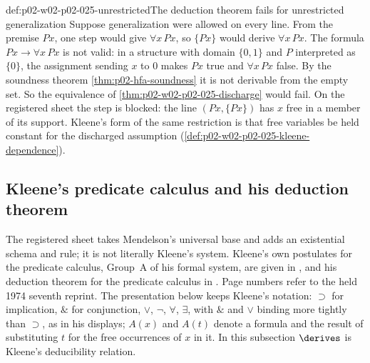 \begin{hbwarning}{def:p02-w02-p02-025-unrestricted}{The deduction theorem fails for unrestricted generalization}
Suppose generalization were allowed on every line.  From the premise \(Px\),
one step would give \(\forall x\,Px\), so
\(\{Px\}\) would derive \(\forall x\,Px\).  The formula
\(Px\to\forall x\,Px\) is not valid: in a structure with domain \(\{0,1\}\)
and \(P\) interpreted as \(\{0\}\), the assignment sending \(x\) to \(0\)
makes \(Px\) true and \(\forall x\,Px\) false.  By the soundness theorem
\cref{thm:p02-hfa-soundness} it is not derivable from the empty set.  So the
equivalence of \cref{thm:p02-w02-p02-025-discharge} would fail.  On the
registered sheet the step is blocked: the line \((Px,\{Px\})\) has \(x\) free
in a member of its support.  Kleene's form of the same restriction is that
free variables be held constant for the discharged assumption
(\cref{def:p02-w02-p02-025-kleene-dependence}).
\end{hbwarning}

\subsection{Kleene's predicate calculus and his deduction theorem}
\label{sec:p02-w02-p02-025-kleene}

The registered sheet takes Mendelson's universal base and adds an
existential schema and rule; it is not literally Kleene's system.  Kleene's
own postulates for the predicate calculus, Group~A of his formal system, are
given in \cite[\S 19, pp.~81--82]{Kleene1952}, and his deduction theorem for
the predicate calculus in \cite[\S\S 21--22, pp.~90--98]{Kleene1952}.  Page
numbers refer to the held 1974 seventh reprint.  The presentation below keeps
Kleene's notation: \(\supset\) for implication, \(\mathbin{\&}\) for
conjunction, \(\lor\), \(\neg\), \(\forall\), \(\exists\), with
\(\mathbin{\&}\) and \(\lor\) binding more tightly than \(\supset\), as in his
displays; \(A(x)\) and \(A(t)\) denote a formula and the result of
substituting \(t\) for the free occurrences of \(x\) in it.  In this
subsection \(\derives\) is Kleene's deducibility relation.

